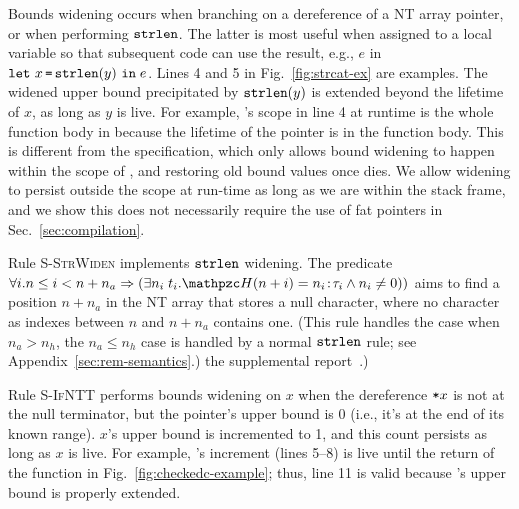 %
Bounds widening occurs when branching on a dereference of a NT array
pointer, or when performing $\mathtt{strlen}$. The latter is most useful
when assigned to a local variable so that subsequent code can use the
result, e.g., $e$ in $\mathtt{let}~x\, \texttt{=}\, \mathtt{strlen}({y})~\mathtt{in}\;{e}$.  Lines 4 and 5 in
Fig.~\ref{fig:strcat-ex} are examples. 
The widened upper bound
precipitated by $\mathtt{strlen}({y})$ is extended beyond the lifetime of $x$, as long as $y$ is live.
For example, 's scope in line 4 at runtime is
the whole function body in  because the lifetime of the pointer  is in the function body.
This is different from the \checkedc specification, 
which only allows bound widening to happen within the scope of , and restoring old bound values once  dies.
We allow widening to persist outside the scope at run-time as long as
we are within the stack frame, and we show
this does not necessarily require the use of fat pointers in
Sec.~\ref{sec:compilation}.

Rule \textsc{S-StrWiden} implements $\mathtt{strlen}$ widening. The
predicate
$\forall i. n \le i < n+n_a \Rightarrow (\exists n_i\;t_i. \heap(n+i)
= \evalue{n_i}{\tau_i} \wedge n_i \neq 0))$ aims to find a position
$n+n_a$ in the NT array that stores a null character, where no
character as indexes between $n$ and $n+n_a$ contains one. (This rule
handles the case when $n_a > n_h$, the $n_a \le n_h$ case is handled
by a normal $\mathtt{strlen}$ rule; see 
\iftr
Appendix~\ref{sec:rem-semantics}.)
\else
the supplemental report~\cite{checkedc-tech-report}.)
\fi

Rule \textsc{S-IfNTT} performs bounds widening on $x$ when the
dereference $\texttt{*}{x}$ is not at the null terminator, but the
pointer's upper bound is 0 (i.e., it's at the end of its known
range). $x$'s upper bound is incremented to 1, and this count persists
as long as $x$ is live.  For example, 's increment (lines
5--8) is live until the return of the function in
Fig.~\ref{fig:checkedc-example}; thus, line 11 is valid because
's upper bound is properly extended. %

